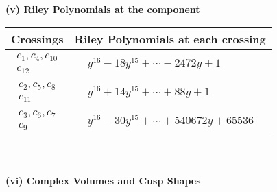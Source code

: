 \documentclass[1p]{elsarticle_modified}
\theoremstyle{definition}
\begin{document}
\newpage\renewcommand{\arraystretch}{1}
\flushleft \textbf{(v) Riley Polynomials at the component}\newline \\
\begin{tabular}{m{50pt}|m{274pt}}
Crossings & \hspace{64pt}Riley Polynomials at each crossing \\
\hline $$\begin{aligned}c_{1},c_{4},c_{10}\\c_{12}\end{aligned}$$&$\begin{aligned}
&y^{16}-18 y^{15}+\cdots-2472 y+1
\end{aligned}$\\
\hline $$\begin{aligned}c_{2},c_{5},c_{8}\\c_{11}\end{aligned}$$&$\begin{aligned}
&y^{16}+14 y^{15}+\cdots+88 y+1
\end{aligned}$\\
\hline $$\begin{aligned}c_{3},c_{6},c_{7}\\c_{9}\end{aligned}$$&$\begin{aligned}
&y^{16}-30 y^{15}+\cdots+540672 y+65536
\end{aligned}$\\
\hline
\end{tabular}\\~\\
\newpage\flushleft \textbf{(vi) Complex Volumes and Cusp Shapes}
\end{document}
